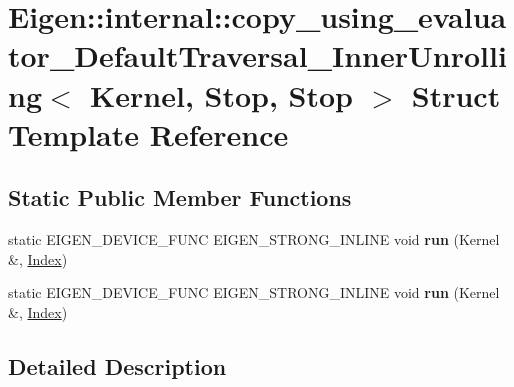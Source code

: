 \hypertarget{struct_eigen_1_1internal_1_1copy__using__evaluator___default_traversal___inner_unrolling_3_01_kernel_00_01_stop_00_01_stop_01_4}{}\section{Eigen\+:\+:internal\+:\+:copy\+\_\+using\+\_\+evaluator\+\_\+\+Default\+Traversal\+\_\+\+Inner\+Unrolling$<$ Kernel, Stop, Stop $>$ Struct Template Reference}
\label{struct_eigen_1_1internal_1_1copy__using__evaluator___default_traversal___inner_unrolling_3_01_kernel_00_01_stop_00_01_stop_01_4}
\subsection*{Static Public Member Functions}
\begin{DoxyCompactItemize}
\item 
\mbox{\label{struct_eigen_1_1internal_1_1copy__using__evaluator___default_traversal___inner_unrolling_3_01_kernel_00_01_stop_00_01_stop_01_4_ad378c60aa2c775fb49af7c666ec92f82}} 
static E\+I\+G\+E\+N\+\_\+\+D\+E\+V\+I\+C\+E\+\_\+\+F\+U\+NC E\+I\+G\+E\+N\+\_\+\+S\+T\+R\+O\+N\+G\+\_\+\+I\+N\+L\+I\+NE void {\bfseries run} (Kernel \&, \hyperlink{namespace_eigen_a62e77e0933482dafde8fe197d9a2cfde}{Index})
\item 
\mbox{\label{struct_eigen_1_1internal_1_1copy__using__evaluator___default_traversal___inner_unrolling_3_01_kernel_00_01_stop_00_01_stop_01_4_ad378c60aa2c775fb49af7c666ec92f82}} 
static E\+I\+G\+E\+N\+\_\+\+D\+E\+V\+I\+C\+E\+\_\+\+F\+U\+NC E\+I\+G\+E\+N\+\_\+\+S\+T\+R\+O\+N\+G\+\_\+\+I\+N\+L\+I\+NE void {\bfseries run} (Kernel \&, \hyperlink{namespace_eigen_a62e77e0933482dafde8fe197d9a2cfde}{Index})
\end{DoxyCompactItemize}


\subsection{Detailed Description}
